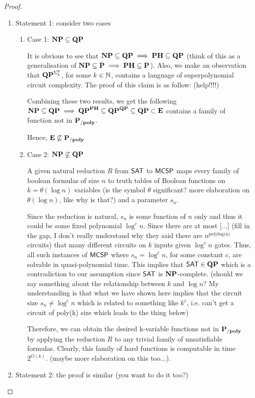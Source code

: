 \documentclass[12pt]{article}
\theoremstyle{definition}
\begin{document}
\begin{proof}
\begin{enumerate}[-]
	\item Statement 1: consider two cases
	\begin{enumerate} [+]
		\item Case 1: $\mathbf{NP} \subseteq \mathbf{QP}$
		
		It is obvious to see that $\mathbf{NP} \subseteq \mathbf{QP} \implies \mathbf{PH} \subseteq \mathbf{QP}$ (think of this as a generalisation of $\mathbf{NP} \subseteq \mathbf{P} \implies \mathbf{PH} \subseteq \mathbf{P}$). Also, we make an observation that $\mathbf{QP}^{\Sigma_k^p}$, for some $k \in {\mathbb{N}}$, contains a language of superpolynomial circuit complexity. The proof of this claim is as follow: (help!!!!)
		
		Combining these two results, we get the following $\mathbf{NP} \subseteq \mathbf{QP} \implies \mathbf{QP}^{\mathbf{PH}} \subseteq \mathbf{QP}^{\mathbf{QP}} \subseteq \mathbf{QP} \subset \mathbf{E}$ contains a family of function not in $\mathbf{P_{/poly}}$. 
		
		Hence, $\mathbf{E} \not\subseteq \mathbf{P_{/poly}}$\\
		
		\item Case 2: $\mathbf{NP} \not\subseteq \mathbf{QP}$
		
		A given natural reduction $R$ from $\mathsf{SAT}$ to $\mathsf{MCSP}$ maps every family of boolean formulas of size $n$  to truth tables of Boolean functions on $k = \theta(\log n)$ variables (is the symbol $\theta$ significant? more elaboration on $\theta(\log n)$, like why is that?) and a parameter $s_n$.
		
		Since the reduction is natural, $s_n$ is some function of $n$ only and thus it could be some fixed polynomial $\log^c n$. Since there are at most [$\dots$] (fill in the gap, I don't really understand why they said there are $n^{\text{polylog(n)}}$ circuits) that many different circuits on $k$ inputs given $\log^c n$ gates. Thus, all such instances of $\mathsf{MCSP}$ where $s_n = \log^c n$, for some constant $c$, are solvable in quasi-polynomial time. This implies that $\mathsf{SAT} \in \mathbf{QP}$ which is a contradiction to our assumption since $\mathsf{SAT}$ is $\mathbf{NP}$-complete. (should we say something about the relationship between $k$ and $\log n$? My understanding is that what we have shown here implies that the circuit size $s_n \neq \log^c n$ which is related to something like $k^c$, i.e. can't get a circuit of poly(k) size which leads to the thing below)
		
		Therefore, we can obtain the desired k-variable functions not in $\mathbf{P_{/poly}}$ by applying the reduction $R$ to any trivial family of unsatisfiable formulas. Clearly, this family of hard functions is computable in time $2^{O(k)}$. (maybe more elaboration on this too...).
		
	\end{enumerate}
	\item Statement 2: the proof is similar (you want to do it too?)
\end{enumerate}
\end{proof}
\end{document}

